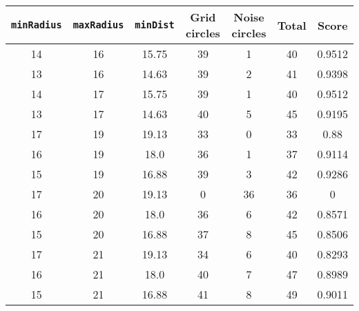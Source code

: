 \documentclass[letterpaper, 12pt]{article}
\begin{document}
\begin{longtable}{|c|c|c|c|c|c|c|}
\hline
\textbf{\texttt{minRadius}} & \textbf{\texttt{maxRadius}} & \textbf{\texttt{minDist}} & \textbf{Grid circles} & \textbf{Noise circles} & \textbf{Total} & \textbf{Score} \\
\hline
14 & 16 & 15.75 & 39 & 1 & 40 & 0.9512 \\
\hline
13 & 16 & 14.63 & 39 & 2 & 41 & 0.9398 \\
\hline
14 & 17 & 15.75 & 39 & 1 & 40 & 0.9512 \\
\hline
13 & 17 & 14.63 & 40 & 5 & 45 & 0.9195 \\
\hline
17 & 19 & 19.13 & 33 & 0 & 33 & 0.88 \\
\hline
16 & 19 & 18.0 & 36 & 1 & 37 & 0.9114 \\
\hline
15 & 19 & 16.88 & 39 & 3 & 42 & 0.9286 \\
\hline
17 & 20 & 19.13 & 0 & 36 & 36 & 0 \\
\hline
16 & 20 & 18.0 & 36 & 6 & 42 & 0.8571 \\
\hline
15 & 20 & 16.88 & 37 & 8 & 45 & 0.8506 \\
\hline
17 & 21 & 19.13 & 34 & 6 & 40 & 0.8293 \\
\hline
16 & 21 & 18.0 & 40 & 7 & 47 & 0.8989 \\
\hline
15 & 21 & 16.88 & 41 & 8 & 49 & 0.9011 \\
\hline
\end{longtable}
\end{document}
